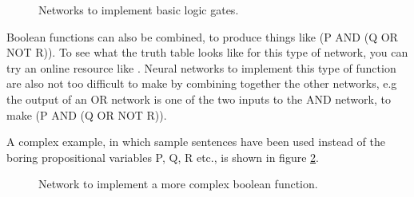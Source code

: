 \begin{figure}[h]
\centering
{}
\caption[Simbrain screenshot]{Networks to implement basic logic gates.}
\label{logic_gates}
\end{figure}

Boolean functions can also be combined, to produce things like (P AND (Q OR NOT R)). To see what the truth table looks like for this type of network, you can try an online resource like . Neural networks to implement this type of function are also not too difficult to make by combining together the other networks, e.g the output of an OR network is one of the two inputs to the AND network, to make (P AND (Q OR NOT R)).

A complex example, in which sample sentences have been used instead of the boring propositional variables P, Q, R etc., is shown in figure \ref{logic_gates_ex}.

\begin{figure}[h]
\centering
{}
\caption[Simbrain screenshot]{Network to implement a more complex boolean function.}
\label{logic_gates_ex}
\end{figure}

